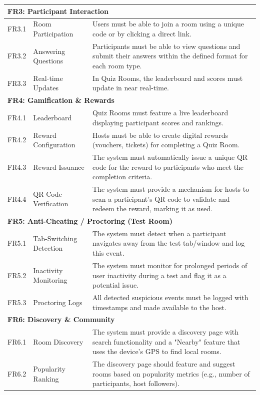 \begin{longtable}{l l p{8.5cm}}
\multicolumn{3}{l}{\textbf{FR3: Participant Interaction}} \\
\midrule
FR3.1 & Room Participation & Users must be able to join a room using a unique code or by clicking a direct link. \\
FR3.2 & Answering Questions & Participants must be able to view questions and submit their answers within the defined format for each room type. \\
FR3.3 & Real-time Updates & In Quiz Rooms, the leaderboard and scores must update in near real-time. \\
\midrule

\multicolumn{3}{l}{\textbf{FR4: Gamification \& Rewards}} \\
\midrule
FR4.1 & Leaderboard & Quiz Rooms must feature a live leaderboard displaying participant scores and rankings. \\
FR4.2 & Reward Configuration & Hosts must be able to create digital rewards (vouchers, tickets) for completing a Quiz Room. \\
FR4.3 & Reward Issuance & The system must automatically issue a unique QR code for the reward to participants who meet the completion criteria. \\
FR4.4 & QR Code Verification & The system must provide a mechanism for hosts to scan a participant's QR code to validate and redeem the reward, marking it as used. \\
\midrule

\multicolumn{3}{l}{\textbf{FR5: Anti-Cheating / Proctoring (Test Room)}} \\
\midrule
FR5.1 & Tab-Switching Detection & The system must detect when a participant navigates away from the test tab/window and log this event. \\
FR5.2 & Inactivity Monitoring & The system must monitor for prolonged periods of user inactivity during a test and flag it as a potential issue. \\
FR5.3 & Proctoring Logs & All detected suspicious events must be logged with timestamps and made available to the host. \\
\midrule

\multicolumn{3}{l}{\textbf{FR6: Discovery \& Community}} \\
\midrule
FR6.1 & Room Discovery & The system must provide a discovery page with search functionality and a "Nearby" feature that uses the device's GPS to find local rooms. \\
FR6.2 & Popularity Ranking & The discovery page should feature and suggest rooms based on popularity metrics (e.g., number of participants, host followers). \\
\midrule


\end{longtable}
